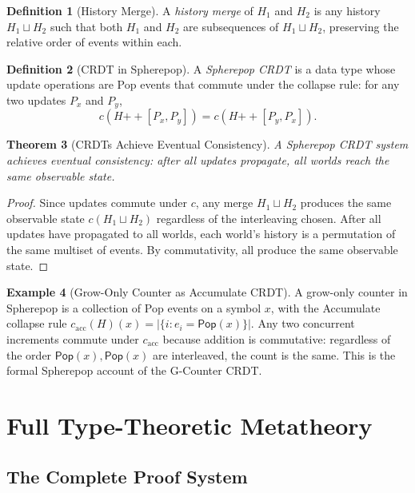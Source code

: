 \documentclass[12pt, a4paper, openany]{book}
\theoremstyle{plain}
\newtheorem{theorem}{Theorem}[chapter]
\theoremstyle{definition}
\newtheorem{definition}[theorem]{Definition}
\newtheorem{example}[theorem]{Example}
\theoremstyle{remark}
\newcommand{\Pop}{\mathsf{Pop}}
\begin{document}
\begin{definition}[History Merge]
A \emph{history merge} of $H_1$ and $H_2$ is any history $H_1 \sqcup H_2$
such that both $H_1$ and $H_2$ are subsequences of $H_1 \sqcup H_2$, preserving
the relative order of events within each.
\end{definition}

\begin{definition}[CRDT in Spherepop]
A \emph{Spherepop CRDT} is a data type whose update operations are Pop events
that commute under the collapse rule: for any two updates $P_x$ and $P_y$,
\[
c(H \mathbin{++} [P_x, P_y]) = c(H \mathbin{++} [P_y, P_x]).
\]
\end{definition}

\begin{theorem}[CRDTs Achieve Eventual Consistency]
A Spherepop CRDT system achieves eventual consistency: after all updates
propagate, all worlds reach the same observable state.
\end{theorem}

\begin{proof}
Since updates commute under $c$, any merge $H_1 \sqcup H_2$ produces the same
observable state $c(H_1 \sqcup H_2)$ regardless of the interleaving chosen.
After all updates have propagated to all worlds, each world's history is a
permutation of the same multiset of events. By commutativity, all produce the
same observable state.
\end{proof}

\begin{example}[Grow-Only Counter as Accumulate CRDT]
A grow-only counter in Spherepop is a collection of Pop events on a symbol $x$,
with the Accumulate collapse rule $c_{\mathrm{acc}}(H)(x) = |\{i : e_i = \Pop(x)\}|$.
Any two concurrent increments commute under $c_{\mathrm{acc}}$ because addition
is commutative: regardless of the order $\Pop(x), \Pop(x)$ are interleaved,
the count is the same. This is the formal Spherepop account of the G-Counter CRDT.
\end{example}


\part{Full Type-Theoretic Metatheory}

\chapter{The Complete Proof System}
\end{document}
